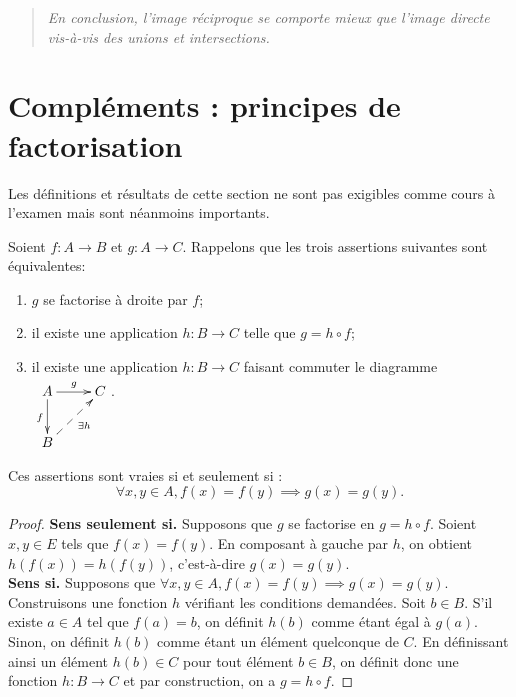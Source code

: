 \begin{quote}
\emph{En conclusion, l'image réciproque se comporte mieux que l'image directe vis-à-vis des unions et intersections.}
\end{quote}



\section{Compléments : principes de factorisation}

Les définitions et résultats de cette section ne sont pas exigibles comme cours à l'examen mais sont néanmoins importants.

\begin{proposition}
\label{prop-CNS-factorisation-droite}
Soient $f : A\to B$ et $g : A\to C$. Rappelons que les trois assertions suivantes sont équivalentes:
\begin{enumerate}
\item  $g$ se factorise à droite par $f$;
\item il existe une application $h : B\to C$ telle que $g = h\circ f$;
\item il existe une application $h : B\to C$ faisant commuter  le diagramme  
$\xymatrix{
A \ar[r]^g \ar[d]_{f}& C\\
B \ar@{-->}[ur]_{\exists h}& 
}$.
\end{enumerate}
Ces assertions sont vraies si et seulement si :
\[\forall x, y \in A, f(x)=f(y) \implies g(x)=g(y).\]
\end{proposition}
\begin{proof}
\textbf{Sens \og seulement si\fg.} Supposons que $g$ se factorise en $g = h\circ f$. Soient $x, y\in E$ tels que $f(x)=f(y)$. En composant à gauche par $h$, on obtient $h(f(x)) = h(f(y))$, c'est-à-dire $g(x)=g(y)$.\\
\textbf{Sens \og si\fg.} Supposons que $\forall x, y \in A, f(x)=f(y) \implies g(x)=g(y)$. Construisons une fonction $h$ vérifiant les conditions demandées. Soit $b\in B$. S'il existe $a\in A$ tel que $f(a)=b$, on définit $h(b)$ comme étant égal à $g(a)$. Sinon, on définit $h(b)$ comme étant un élément quelconque de $C$. En définissant ainsi un élément $h(b)\in C$ pour tout élément $b\in B$, on définit donc une fonction $h : B\to C$ et par construction, on a $g = h\circ f$.
\end{proof}


